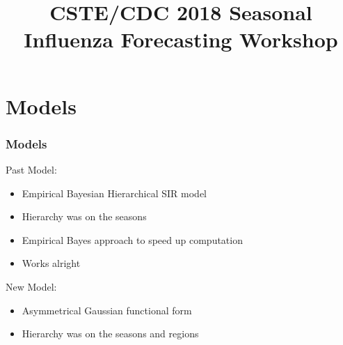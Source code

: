 \documentclass{beamer}\usepackage[]{graphicx}\usepackage[]{color}
\title{CSTE/CDC 2018 Seasonal Influenza Forecasting Workshop}
\begin{document}
\begin{frame}
\maketitle
\end{frame}





\section{Models}
\begin{frame}
\frametitle{Models}

Past Model:
\begin{itemize}
\item Empirical Bayesian Hierarchical SIR model
\item Hierarchy was on the seasons
\item Empirical Bayes approach to speed up computation
\item Works alright \\
\end{itemize}

\vspace{5mm}

\pause
New Model:
\begin{itemize}
\item Asymmetrical Gaussian functional form
\item Hierarchy was on the seasons and regions
\end{itemize}

\end{frame}




\end{document}

